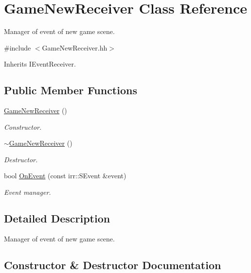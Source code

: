\hypertarget{classGameNewReceiver}{}\section{Game\+New\+Receiver Class Reference}
\label{classGameNewReceiver}


Manager of event of new game scene.  




{\ttfamily \#include $<$Game\+New\+Receiver.\+hh$>$}



Inherits I\+Event\+Receiver.

\subsection*{Public Member Functions}
\begin{DoxyCompactItemize}
\item 
\hyperlink{classGameNewReceiver_a8f506ac1b4d6841b446ad239b615c079}{Game\+New\+Receiver} ()
\begin{DoxyCompactList}\small\item\em Constructor. \end{DoxyCompactList}\item 
\hyperlink{classGameNewReceiver_ab92b6653b56d291853a4e2f737eaf6fd}{$\sim$\+Game\+New\+Receiver} ()
\begin{DoxyCompactList}\small\item\em Destructor. \end{DoxyCompactList}\item 
bool \hyperlink{classGameNewReceiver_ad9ec097d8b46946ed1a21c24463fc0b6}{On\+Event} (const irr\+::\+S\+Event \&event)
\begin{DoxyCompactList}\small\item\em Event manager. \end{DoxyCompactList}\end{DoxyCompactItemize}


\subsection{Detailed Description}
Manager of event of new game scene. 

\subsection{Constructor \& Destructor Documentation}
\mbox{\label{classGameNewReceiver_a8f506ac1b4d6841b446ad239b615c079}} 
